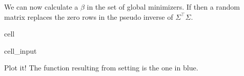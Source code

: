 \documentclass[letterpaper,10pt,english]{jupyterBook}
\begin{document}
\sphinxAtStartPar
We can now calculate a \(\beta\) in the set of global minimizers. If  then a random matrix replaces the zero rows in the pseudo inverse of \(\Sigma^\top\Sigma\).

\begin{sphinxuseclass}{cell}\begin{sphinxVerbatimInput}

\begin{sphinxuseclass}{cell_input}
\begin{sphinxVerbatim}[commandchars=\\\{\}]
  
      
    \PYG{p}{[}\PYG{p}{]}  \PYG{p}{[}\PYG{p}{]}
      
     
        \PYG{p}{[}\PYG{p}{]}
         
        \PYG{p}{[}\PYG{p}{]}
     
\end{sphinxVerbatim}

\end{sphinxuseclass}\end{sphinxVerbatimInput}

\end{sphinxuseclass}
\sphinxAtStartPar
Plot it! The function resulting from setting  is the one in blue.
\end{document}
